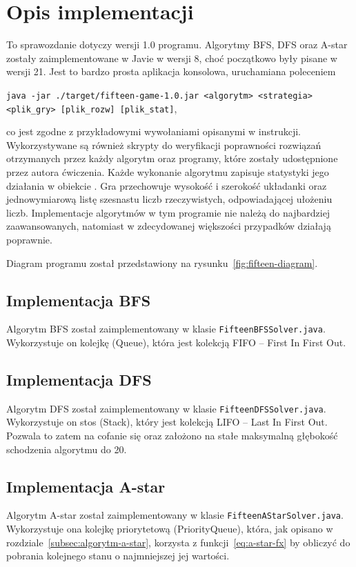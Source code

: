 \documentclass{classrep}
\begin{document}
    \section{Opis implementacji}\label{sec:opis-implementacji}
    To sprawozdanie dotyczy wersji 1.0 programu.
    Algorytmy BFS, DFS oraz A-star zostały zaimplementowane w Javie w wersji 8, choć początkowo były pisane w wersji 21.
    Jest to bardzo prosta aplikacja konsolowa, uruchamiana poleceniem
    \begin{center}
        \texttt{java -jar ./target/fifteen-game-1.0.jar <algorytm> <strategia> <plik\_gry> [plik\_rozw] [plik\_stat]},
    \end{center}
    co jest zgodne z przykładowymi wywołaniami opisanymi w instrukcji.
    Wykorzystywane są również skrypty do weryfikacji poprawności rozwiązań otrzymanych przez każdy algorytm oraz programy,
    które zostały udostępnione przez autora ćwiczenia.
    Każde wykonanie algorytmu zapisuje statystyki jego działania w obiekcie .
    Gra przechowuje wysokość i szerokość układanki oraz jednowymiarową listę szesnastu liczb rzeczywistych,
    odpowiadającej ułożeniu liczb.
    Implementacje algorytmów w tym programie nie należą do najbardziej zaawansowanych, natomiast w zdecydowanej
    większości przypadków działają poprawnie.

    Diagram programu został przedstawiony na rysunku~\ref{fig:fifteen-diagram}.

    \subsection{Implementacja BFS}\label{subsec:implementacja-bfs}
    Algorytm BFS został zaimplementowany w klasie \texttt{FifteenBFSSolver.java}.
    Wykorzystuje on kolejkę (Queue), która jest kolekcją FIFO -- First In First Out.

    \subsection{Implementacja DFS}\label{subsec:implementacja-dfs}
    Algorytm DFS został zaimplementowany w klasie \texttt{FifteenDFSSolver.java}.
    Wykorzystuje on stos (Stack), który jest kolekcją LIFO -- Last In First Out.
    Pozwala to zatem na cofanie się oraz założono na stałe maksymalną głębokość schodzenia algorytmu do 20.

    \subsection{Implementacja A-star}\label{subsec:implementacja-a-star}
    Algorytm A-star został zaimplementowany w klasie \texttt{FifteenAStarSolver.java}.
    Wykorzystuje ona kolejkę priorytetową (PriorityQueue), która, jak opisano w rozdziale~\ref{subsec:algorytm-a-star},
    korzysta z funkcji~\ref{eq:a-star-fx} by obliczyć do pobrania kolejnego stanu o najmniejszej jej wartości.
\end{document}
